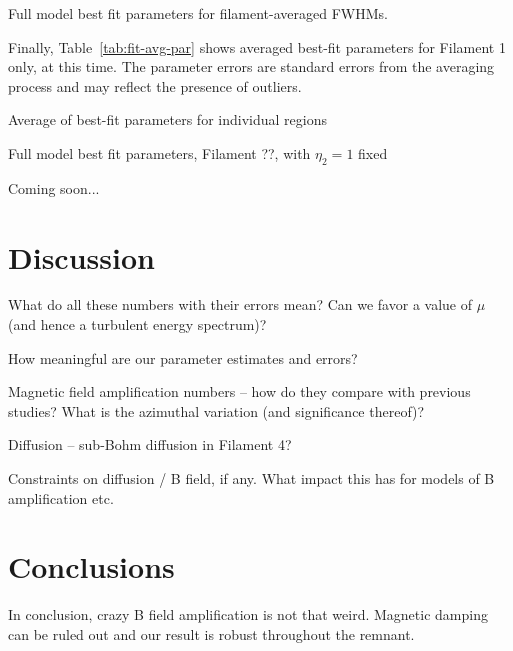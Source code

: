 \documentclass[iop, apj, numberedappendix, twocolappendix]{emulateapj}
\begin{document}
\begin{table*}
\scriptsize
\centering
\caption{Full model best fit parameters for filament-averaged FWHMs.
    \label{tab:fit-avg-fwhm}}

\end{table*}

Finally, Table~\ref{tab:fit-avg-par} shows averaged best-fit parameters for
Filament 1 only, at this time.  The parameter errors are standard errors from
the averaging process and may reflect the presence of outliers.

\begin{table*}
\scriptsize
\centering
\caption{Average of best-fit parameters for individual regions
    \label{tab:fit-avg-par}}

\end{table*}

\begin{table*}
\scriptsize
\centering
\caption{Full model best fit parameters, Filament ??, with $\eta_2 = 1$ fixed}
%
Coming soon...
\end{table*}

\section{Discussion}

What do all these numbers with their errors mean?
Can we favor a value of $\mu$ (and hence a turbulent energy spectrum)?

How meaningful are our parameter estimates and errors?

Magnetic field amplification numbers -- how do they compare with previous
studies?  What is the azimuthal variation (and significance thereof)?

Diffusion -- sub-Bohm diffusion in Filament 4?

Constraints on diffusion / B field, if any.  What impact this has for models of
B amplification etc.


\section{Conclusions}

In conclusion, crazy B field amplification is not that weird.
Magnetic damping can be ruled out and our result is robust throughout the remnant.

\acknowledgments
\end{document}
